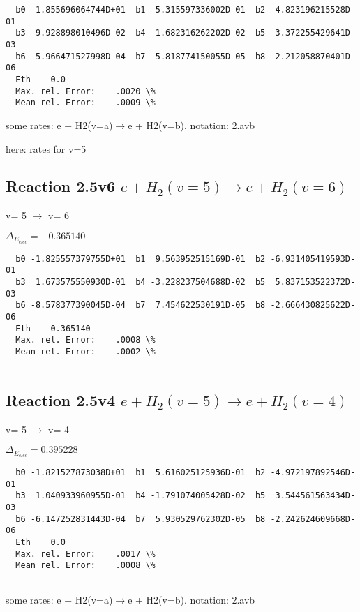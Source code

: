 \documentclass[12pt,dvipdfmx]{article}
\begin{document}
\begin{small}\begin{verbatim}
  b0 -1.855696064744D+01  b1  5.315597336002D-01  b2 -4.823196215528D-01
  b3  9.928898010496D-02  b4 -1.682316262202D-02  b5  3.372255429641D-03
  b6 -5.966471527998D-04  b7  5.818774150055D-05  b8 -2.212058870401D-06
  Eth    0.0
  Max. rel. Error:    .0020 \%
  Mean rel. Error:    .0009 \%

\end{verbatim}\end{small}

\newpage
some rates: e + H2(v=a)$\rightarrow$e + H2(v=b). notation: 2.avb

here: rates for v=5


\subsection{
Reaction 2.5v6
$ e + H_2(v=5) \rightarrow e + H_2(v=6) $
}

  v=  5 $\rightarrow$ v= 6


$\Delta_{E_{elec}}=-0.365140$


\begin{small}\begin{verbatim}
  b0 -1.825557379755D+01  b1  9.563952515169D-01  b2 -6.931405419593D-01
  b3  1.673575550930D-01  b4 -3.228237504688D-02  b5  5.837153522372D-03
  b6 -8.578377390045D-04  b7  7.454622530191D-05  b8 -2.666430825622D-06
  Eth    0.365140
  Max. rel. Error:    .0008 \%
  Mean rel. Error:    .0002 \%


\end{verbatim}\end{small}

\subsection{
Reaction 2.5v4
$ e + H_2(v=5) \rightarrow e + H_2(v=4) $
}

  v=  5 $\rightarrow$ v= 4

$\Delta_{E_{elec}}= 0.395228$


\begin{small}\begin{verbatim}
  b0 -1.821527873038D+01  b1  5.616025125936D-01  b2 -4.972197892546D-01
  b3  1.040933960955D-01  b4 -1.791074005428D-02  b5  3.544561563434D-03
  b6 -6.147252831443D-04  b7  5.930529762302D-05  b8 -2.242624609668D-06
  Eth    0.0
  Max. rel. Error:    .0017 \%
  Mean rel. Error:    .0008 \%


\end{verbatim}\end{small}
\newpage
some rates: e + H2(v=a)$\rightarrow$e + H2(v=b). notation: 2.avb
\end{document}
